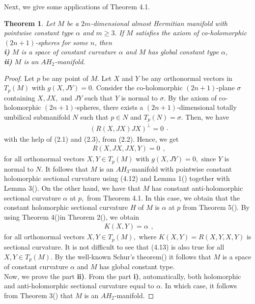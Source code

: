 \documentclass{amsart}
\newtheorem{theorem}{Theorem}[section]
\newtheorem*{theorem A}{Theorem A}
\newtheorem*{theorem B}{N\"olker's Theorem}
\theoremstyle{remark}
\theoremstyle{remark}
\theoremstyle{definition}
\numberwithin{equation}{section}
\begin{document}
Next, we give some applications of Theorem 4.1.
\begin{theorem}
Let $M$ be a $2m$-dimensional almost Hermitian manifold with
pointwise constant type
$\alpha$ and $m\geq3.$ If $M$ satisfies the axiom of co-holomorphic $(2n+1)$-spheres for some $n$, then\\
\textbf{i)} $M$ is a space of constant curvature $\alpha$ and $M$ has global constant type $\alpha$,\\
\textbf{ii)} $M$ is an $AH_{2}$-manifold.
\end{theorem}
\begin{proof} Let $p$ be any point of $M$. Let $X$ and $Y$  be any orthonormal
vectors in $T_{p}(M)$ with $g(X,JY)=0.$  Consider the co-holomorphic
$(2n+1)$-plane $\sigma$ containing $X,JX,$ and $JY$ such that $Y$ is
normal to $\sigma$. By the axiom of co-holomorphic $(2n+1)$-spheres,
there exists a $(2n+1)$-dimensional totally umbilical submanifold
$N$ such that $p\in N$ and $T_{p}(N)=\sigma.$ Then, we have
\begin{equation}
\label{e1}
\begin{array}{c}
(R(X,JX)JX)^{\bot}=0
\end{array}.
\end{equation}
with the help of (2.1) and (2.3), from (2.2). Hence, we get
\begin{equation}
\label{e1}
\begin{array}{c}
R(X,JX,JX,Y)=0
\end{array},
\end{equation}
for all orthonormal vectors $X,Y\in T_{p}(M)$ with $g(X,JY)=0,$
since $Y$ is normal to $N$. It follows that $M$ is an
$AH_{3}$-manifold with pointwise constant holomorphic sectional
curvature using (4.12) and Lemma 1(\cite{Kas}) together with Lemma
3(\cite{Kas}). On the other hand, we have that $M$ has constant
anti-holomorphic sectional curvature $\alpha$ at $p,$ from  Theorem
4.1. In this case, we obtain that the constant holomorphic sectional
curvature $H$ of $M$ is $\alpha$ at $p$ from Theorem 5(\cite{Van}).
By using Theorem 4(\cite{Van})in Theorem 2(\cite{Van}), we obtain
\begin{equation}
\label{e1}
\begin{array}{c}
K(X,Y)=\alpha
\end{array},
\end{equation}
for all orthonormal vectors $X,Y\in T_{p}(M),$ where
$K(X,Y)=R(X,Y,X,Y)$ is sectional curvature. It is not difficult to
see that (4.13) is also true for all $X,Y\in T_{p}(M).$ By the
well-known Schur's theorem(\cite{Yan})
it follows that $M$ is a space of constant curvature $\alpha$ and $M$ has global constant type.\\
Now, we prove the part \textbf{ii)}. From the part \textbf{i)},
automatically, both holomorphic and anti-holomorphic sectional
curvature equal to $\alpha$. In which case, it follows from  Theorem
3(\cite{Gan}) that $M$ is an $AH_{2}$-manifold.
\end{proof}
\end{document}
